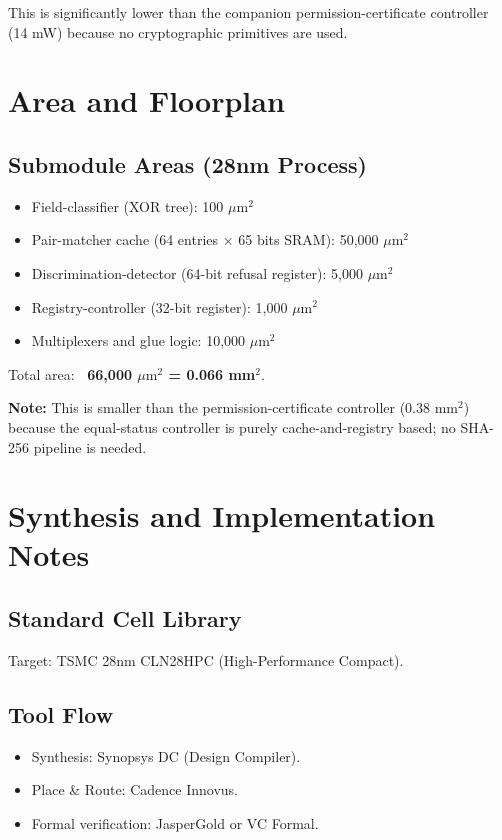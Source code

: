 \documentclass[11pt,oneside]{article}
\begin{document}
This is significantly lower than the companion permission-certificate controller (14 mW) because no cryptographic primitives are used.

\section{Area and Floorplan}

\subsection{Submodule Areas (28nm Process)}

\begin{itemize}
\item Field-classifier (XOR tree): 100 $\mu\text{m}^2$
\item Pair-matcher cache (64 entries × 65 bits SRAM): 50,000 $\mu\text{m}^2$
\item Discrimination-detector (64-bit refusal register): 5,000 $\mu\text{m}^2$
\item Registry-controller (32-bit register): 1,000 $\mu\text{m}^2$
\item Multiplexers and glue logic: 10,000 $\mu\text{m}^2$
\end{itemize}

Total area: \textbf{~66,000 $\mu\text{m}^2$ = 0.066 mm$^2$}.

\textbf{Note:} This is smaller than the permission-certificate controller (0.38 mm$^2$) because the equal-status controller is purely cache-and-registry based; no SHA-256 pipeline is needed.

\section{Synthesis and Implementation Notes}

\subsection{Standard Cell Library}

Target: TSMC 28nm CLN28HPC (High-Performance Compact).

\subsection{Tool Flow}

\begin{itemize}
\item Synthesis: Synopsys DC (Design Compiler).
\item Place \& Route: Cadence Innovus.
\item Formal verification: JasperGold or VC Formal.
\end{itemize}
\end{document}
